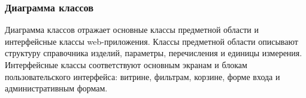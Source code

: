 \documentclass[a4paper,14pt]{extarticle}
\begin{document}
\subsubsection{Диаграмма классов}

Диаграмма классов отражает основные классы предметной области и интерфейсные классы web-приложения. Классы предметной области описывают структуру справочника изделий, параметры, перечисления и единицы измерения. Интерфейсные классы соответствуют основным экранам и блокам пользовательского интерфейса: витрине, фильтрам, корзине, форме входа и административным формам.




\end{document}
